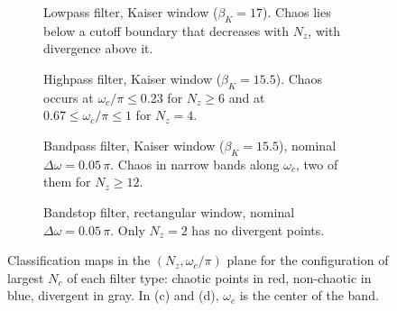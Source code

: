 \documentclass[journal]{IEEEtran}
\begin{document}
\begin{figure}[!t]
\centering
\begin{subfigure}[t]{0.48\textwidth}
\centering

\caption{Lowpass filter, Kaiser window ($\beta_K = 17$). Chaos lies below a
cutoff boundary that decreases with $N_z$, with divergence above it.}
\label{fig:lowpass}
\end{subfigure}
\hfill
\begin{subfigure}[t]{0.48\textwidth}
\centering

\caption{Highpass filter, Kaiser window ($\beta_K = 15.5$). Chaos occurs at
$\omega_c/\pi \le 0.23$ for $N_z \ge 6$ and at $0.67 \le \omega_c/\pi \le 1$
for $N_z = 4$.}
\label{fig:highpass}
\end{subfigure}

\vspace{1.5ex}
\begin{subfigure}[t]{0.48\textwidth}
\centering

\caption{Bandpass filter, Kaiser window ($\beta_K = 15.5$), nominal
$\Delta\omega = 0.05\,\pi$. Chaos in narrow bands along $\omega_c$, two of
them for $N_z\ge12$.}
\label{fig:bandpass}
\end{subfigure}
\hfill
\begin{subfigure}[t]{0.48\textwidth}
\centering

\caption{Bandstop filter, rectangular window, nominal
$\Delta\omega = 0.05\,\pi$. Only $N_z = 2$ has no divergent points.}
\label{fig:bandstop}
\end{subfigure}
\caption{Classification maps in the $(N_z,\omega_c/\pi)$ plane for the
configuration of largest $N_c$ of each filter type: chaotic points in red,
non-chaotic in blue, divergent in gray. In (c) and (d), $\omega_c$ is the
center of the band.}
\label{fig:maps}
\end{figure}
\end{document}

